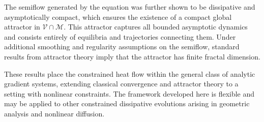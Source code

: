 \documentclass[reqno]{amsart}
\begin{document}
The semiflow generated by the equation was further shown to be dissipative and
asymptotically compact, which ensures the existence of a compact global attractor
in $\mathcal V\cap\mathcal M$. This attractor captures all bounded asymptotic dynamics
and consists entirely of equilibria and trajectories connecting them. Under additional
smoothing and regularity assumptions on the semiflow, standard results from attractor
theory imply that the attractor has finite fractal dimension.

These results place the constrained heat flow within the general class of analytic
gradient systems, extending classical convergence and attractor theory to a setting with
nonlinear constraints. The framework developed here is flexible and may be applied
to other constrained dissipative evolutions arising in geometric analysis and nonlinear
diffusion.
\end{document}

